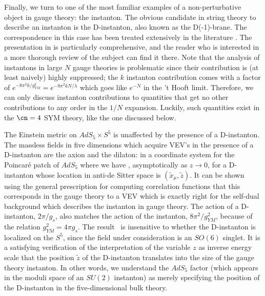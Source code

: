 Finally, we turn to one of the most familiar examples of a non-perturbative
object in gauge theory: the instanton.  The obvious candidate in string
theory to describe an instanton is the D-instanton, also known as the
D(-1)-brane.  The correspondence in this case has been treated extensively
in the literature
\cite{Banks:1998nr,Chu:1998in,Kogan:1998re,Bianchi:1998nk,Brodie:1998ke,
Balasubramanian:1998de,Dorey:1998xe,Dorey:1999pd}.  The
presentation in \cite{Dorey:1999pd} is particularly comprehensive, and the
reader who is interested in a more thorough review of the subject can find
it there.  Note that the analysis of instantons in large $N$ gauge theories
is problematic since their contribution is (at least naively) highly
suppressed; the $k$ instanton contribution comes with a factor of
$e^{-8\pi^2k/g_{YM}^2} = e^{-8\pi^2 kN/\lambda}$ which goes like $e^{-N}$
in the 't Hooft limit. Therefore, we can only discuss instanton
contributions to quantities that get no other contributions to any order in
the $1/N$ expansion.  Luckily, such quantities exist in the $\cn=4$ SYM
theory, like the one discussed below.

The Einstein metric on $AdS_5 \times S^5$ is unaffected by
the presence of a D-instanton.  The massless fields in five dimensions
which acquire VEV's in the presence of a D-instanton are the axion and the
dilaton: in a coordinate system for the Poincar\'e patch of $AdS_5$ where 
 we have
\cite{Chu:1998in,Kogan:1998re,Bianchi:1998nk,Balasubramanian:1998de}, 
asymptotically as $z \to 0$,
for a D-instanton whose location in anti-de Sitter space is
$(\tilde{x}_\mu,\tilde{z})$. It can be shown using the general
prescription for computing correlation functions that this
corresponds in the gauge theory to a VEV
 which is exactly right for the self-dual background which describes the
instanton in gauge theory.  The action of a D-instanton, $2\pi/g_s$, also
matches the action of the instanton, $8\pi^2/g_{YM}^2$, because of the
relation $g_{YM}^2 = 4\pi g_s$.  The
result \VEVF\ is insensitive to whether the D-instanton is localized on the
$S^5$, since the field under consideration is an $SO(6)$ singlet.  It is a
satisfying verification of the interpretation of the variable $z$ as
inverse energy scale that the position $\tilde{z}$ of the D-instanton
translates into the size of the gauge theory instanton.  In other words, we
understand the $AdS_5$ factor (which appears in the moduli space of an
$SU(2)$ instanton) as merely specifying the position of the D-instanton in
the five-dimensional bulk theory.

